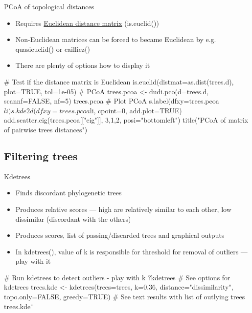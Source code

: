 \documentclass[compress, ucs, xelatex, 11pt, xcolor=x11names, aspectratio=169,
	hyperref={
		bookmarks=true,
		unicode=true,
		colorlinks=true,
		pdftitle={HybSeq course},
		plainpages=false,
		pdfauthor={Vojtech Zeisek},
		pdfsubject={Practical processing of HybSeq target enrichment sequencing data on computing grids like MetaCentrum},
		pdfcreator={XeLaTeX},
		pdfkeywords={BASH, command line, GNU, HybSeq, Linux, MetaCentrum, sequencing shell, target enrichment},
		linkcolor=Cyan2, %
		anchorcolor=Firebrick2, %
		citecolor=Firebrick2, %
		filecolor=Firebrick2, %
		menucolor=Firebrick2, %
		urlcolor=Chartreuse2, %
		pdftex},
	url={hyphens, lowtilde} %
	]{beamer}
\renewcommand{\texttt}[1]{\colorbox{Snow4}{{\ttfamily #1}}}
\renewcommand{\alert}[1]{\textcolor{OrangeRed2}{#1}}
\begin{document}
\begin{frame}[fragile]{PCoA of topological distances}
	\begin{itemize}
		\item Requires \href{https://en.wikipedia.org/wiki/Euclidean_distance_matrix}{Euclidean distance matrix} (\texttt{is.euclid()})
		\item Non-Euclidean matrices can be forced to became Euclidean by e.g. \texttt{quasieuclid()} or \texttt{cailliez()}
		\item There are plenty of options how to display it
	\end{itemize}
	\begin{spluscode}
    # Test if the distance matrix is Euclidean
    is.euclid(distmat=as.dist(trees.d), plot=TRUE, tol=1e-05)
    # PCoA
    trees.pcoa <- dudi.pco(d=trees.d, scannf=FALSE, nf=5)
    trees.pcoa
    # Plot PCoA
    s.label(dfxy=trees.pcoa$li)
    s.kde2d(dfxy=trees.pcoa$li, cpoint=0, add.plot=TRUE)
    add.scatter.eig(trees.pcoa[["eig"]], 3,1,2, posi="bottomleft")
    title("PCoA of matrix of pairwise trees distances")
	\end{spluscode}
\end{frame}

\subsection{Filtering trees}

\begin{frame}[fragile]{Kdetrees}
	\begin{itemize}
		\item Finds discordant phylogenetic trees
		\item Produces relative scores --- high are relatively similar to each other, low dissimilar (discordant with the others)
		\item Produces scores, list of passing/discarded trees and graphical outputs
		\item In \texttt{kdetrees()}, \alert{value of \texttt{k} is responsible for threshold for removal of outliers --- play with it}
	\end{itemize}
	\begin{spluscode}
    # Run kdetrees to detect outliers - play with k
    ?kdetrees # See options for kdetrees
    trees.kde <- kdetrees(trees=trees, k=0.36, distance="dissimilarity",
      topo.only=FALSE, greedy=TRUE)
     # See text results with list of outlying trees
    trees.kde¨
	\end{spluscode}
\end{frame}
\end{document}

